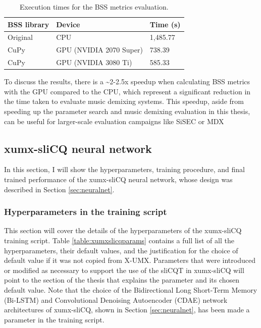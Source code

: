 \documentclass[report.tex]{subfiles}
\begin{document}
\begin{table}[ht]
	\centering
	\caption{Execution times for the BSS metrics evaluation.}
	\label{table:cupybssresults}
	\begin{tabular}{ |l|l|l| }
	 \hline
		BSS library & Device & Time (s) \\
	 \hline
	 \hline
		Original & CPU & 1,485.77 \\
	 \hline
		CuPy & GPU (NVIDIA 2070 Super) & 738.39 \\
	 \hline
		CuPy & GPU (NVIDIA 3080 Ti) & 585.33 \\
	 \hline
\end{tabular}
\end{table}

To discuss the results, there is a \textasciitilde2-2.5x speedup when calculating BSS metrics with the GPU compared to the CPU, which represent a significant reduction in the time taken to evaluate music demixing systems. This speedup, aside from speeding up the parameter search and music demixing evaluation in this thesis, can be useful for larger-scale evaluation campaigns like SiSEC \parencite{sisec2018} or MDX \parencite{mdx21}

\newpagefill

\subsection{xumx-sliCQ neural network}
\label{sec:nnresults}

In this section, I will show the hyperparameters, training procedure, and final trained performance of the xumx-sliCQ neural network, whose design was described in Section \ref{sec:neuralnet}.

\subsubsection{Hyperparameters in the training script}
\label{sec:hyperparams}

This section will cover the details of the hyperparameters of the xumx-sliCQ training script. Table \ref{table:xumxslicqparams} contains a full list of all the hyperparameters, their default values, and the justification for the choice of default value if it was not copied from X-UMX. Parameters that were introduced or modified as necessary to support the use of the sliCQT in xumx-sliCQ will point to the section of the thesis that explains the parameter and its chosen default value. Note that the choice of the Bidirectional Long Short-Term Memory (Bi-LSTM) and Convolutional Denoising Autoencoder (CDAE) network architectures of xumx-sliCQ, shown in Section \ref{sec:neuralnet}, has been made a parameter in the training script.
\end{document}
